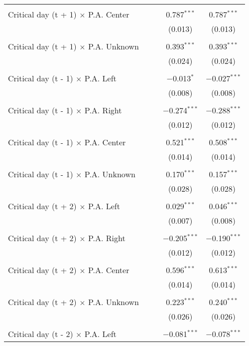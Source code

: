 \documentclass[
]{article}
\begin{document}
\begin{table}[!htbp]
{\begin{tabular}{@{\extracolsep{5pt}}lcccc}
  & & & & \\ 
 Critical day (t + 1) $\times$ P.A. Center &  &  & 0.787$^{***}$ & 0.787$^{***}$ \\ 
  &  &  & (0.013) & (0.013) \\ 
  & & & & \\ 
 Critical day (t + 1) $\times$ P.A. Unknown &  &  & 0.393$^{***}$ & 0.393$^{***}$ \\ 
  &  &  & (0.024) & (0.024) \\ 
  & & & & \\ 
 Critical day (t - 1) $\times$ P.A. Left &  &  & $-$0.013$^{*}$ & $-$0.027$^{***}$ \\ 
  &  &  & (0.008) & (0.008) \\ 
  & & & & \\ 
 Critical day (t - 1) $\times$ P.A. Right &  &  & $-$0.274$^{***}$ & $-$0.288$^{***}$ \\ 
  &  &  & (0.012) & (0.012) \\ 
  & & & & \\ 
 Critical day (t - 1) $\times$ P.A. Center &  &  & 0.521$^{***}$ & 0.508$^{***}$ \\ 
  &  &  & (0.014) & (0.014) \\ 
  & & & & \\ 
 Critical day (t - 1) $\times$ P.A. Unknown &  &  & 0.170$^{***}$ & 0.157$^{***}$ \\ 
  &  &  & (0.028) & (0.028) \\ 
  & & & & \\ 
 Critical day (t + 2) $\times$ P.A. Left &  &  & 0.029$^{***}$ & 0.046$^{***}$ \\ 
  &  &  & (0.007) & (0.008) \\ 
  & & & & \\ 
 Critical day (t + 2) $\times$ P.A. Right &  &  & $-$0.205$^{***}$ & $-$0.190$^{***}$ \\ 
  &  &  & (0.012) & (0.012) \\ 
  & & & & \\ 
 Critical day (t + 2) $\times$ P.A. Center &  &  & 0.596$^{***}$ & 0.613$^{***}$ \\ 
  &  &  & (0.014) & (0.014) \\ 
  & & & & \\ 
 Critical day (t + 2) $\times$ P.A. Unknown &  &  & 0.223$^{***}$ & 0.240$^{***}$ \\ 
  &  &  & (0.026) & (0.026) \\ 
  & & & & \\ 
 Critical day (t - 2) $\times$ P.A. Left &  &  & $-$0.081$^{***}$ & $-$0.078$^{***}$ \\ 

\end{tabular}}
\end{table}
\end{document}
